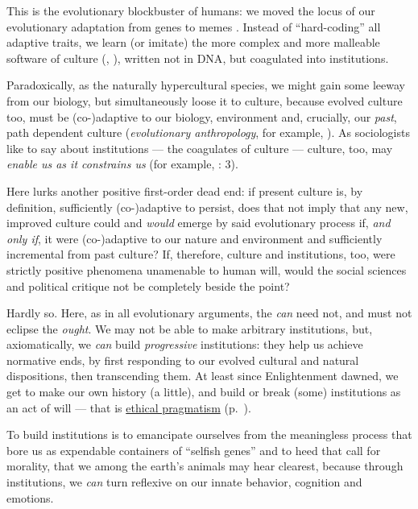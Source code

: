 This is the evolutionary blockbuster of humans: we moved the locus of our evolutionary adaptation from genes to memes \citep{Dawkins1976}. 
Instead of ``hard-coding'' all adaptive traits, we learn (or imitate) the more complex and more malleable software of culture (\citealt{Boyd1985}, \citealt[K196ff]{Henrich2007}), written not in \gls{DNA}, but coagulated into institutions. 

Paradoxically, as the naturally hypercultural species, we might gain some leeway from our biology, but simultaneously loose it to culture, because evolved culture too, must be (co-)adaptive to our biology, environment and, crucially, our \emph{past}, path dependent culture (\emph{evolutionary anthropology}, for example, \citealt{Wright2000}). 
As sociologists like to say about institutions --- the coagulates of culture --- culture, too, may \emph{enable us as it constrains us} (for example, \citealt{Hodgson2006}: 3). 

Here lurks another positive first-order dead end: if present culture is, by definition, sufficiently (co-)adaptive to persist, does that not imply that any new, improved culture could and \emph{would} emerge by said evolutionary process if, \emph{and only if}, it were (co-)adaptive to our nature and environment and sufficiently incremental from past culture? 
If, therefore, culture and institutions, too, were strictly positive phenomena unamenable to human will, would the social sciences and political critique not be completely beside the point? %

Hardly so. 
Here, as in all evolutionary arguments, the \emph{can} need not, and must not eclipse the \emph{ought}. 
We may not be able to make arbitrary institutions, but, axiomatically, we \emph{can} build \emph{progressive} institutions: they help us achieve normative ends, by first responding to our evolved cultural and natural dispositions, then transcending them. 
At least since Enlightenment dawned, we get to make our own history (a little), and build or break (some) institutions as an act of will --- that is \hyperref[itm:pragmatic-ethics]{ethical pragmatism} (p.~\pageref{itm:pragmatic-ethics}). 

To build institutions is to emancipate ourselves from the meaningless process that bore us as expendable containers of ``selfish genes'' \citep{Dawkins1976} and to heed that call for morality, that we among the earth's animals may hear clearest, because through institutions, we \emph{can} turn reflexive on our innate behavior, cognition and emotions. 

